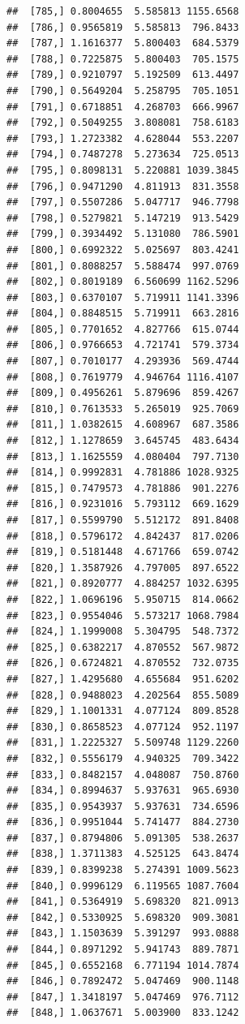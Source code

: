 \documentclass[article]{jss}\usepackage[]{graphicx}\usepackage[]{xcolor}
\makeatletter
\newenvironment{kframe}{%
 \def\at@end@of@kframe{}%
 \ifinner\ifhmode%
  \def\at@end@of@kframe{\end{minipage}}%
  \begin{minipage}{\columnwidth}%
 \fi\fi%
 \def\FrameCommand##1{\hskip\@totalleftmargin \hskip-\fboxsep
 \colorbox{shadecolor}{##1}\hskip-\fboxsep
     \hskip-\linewidth \hskip-\@totalleftmargin \hskip\columnwidth}%
 \MakeFramed {\advance\hsize-\width
   \@totalleftmargin\z@ \linewidth\hsize
   \@setminipage}}%
 {\par\unskip\endMakeFramed%
 \at@end@of@kframe}
\newenvironment{knitrout}{}{} %
\makeatother
\begin{document}
\begin{knitrout}
\begin{kframe}
\begin{verbatim}
##  [785,] 0.8004655  5.585813 1155.6568
##  [786,] 0.9565819  5.585813  796.8433
##  [787,] 1.1616377  5.800403  684.5379
##  [788,] 0.7225875  5.800403  705.1575
##  [789,] 0.9210797  5.192509  613.4497
##  [790,] 0.5649204  5.258795  705.1051
##  [791,] 0.6718851  4.268703  666.9967
##  [792,] 0.5049255  3.808081  758.6183
##  [793,] 1.2723382  4.628044  553.2207
##  [794,] 0.7487278  5.273634  725.0513
##  [795,] 0.8098131  5.220881 1039.3845
##  [796,] 0.9471290  4.811913  831.3558
##  [797,] 0.5507286  5.047717  946.7798
##  [798,] 0.5279821  5.147219  913.5429
##  [799,] 0.3934492  5.131080  786.5901
##  [800,] 0.6992322  5.025697  803.4241
##  [801,] 0.8088257  5.588474  997.0769
##  [802,] 0.8019189  6.560699 1162.5296
##  [803,] 0.6370107  5.719911 1141.3396
##  [804,] 0.8848515  5.719911  663.2816
##  [805,] 0.7701652  4.827766  615.0744
##  [806,] 0.9766653  4.721741  579.3734
##  [807,] 0.7010177  4.293936  569.4744
##  [808,] 0.7619779  4.946764 1116.4107
##  [809,] 0.4956261  5.879696  859.4267
##  [810,] 0.7613533  5.265019  925.7069
##  [811,] 1.0382615  4.608967  687.3586
##  [812,] 1.1278659  3.645745  483.6434
##  [813,] 1.1625559  4.080404  797.7130
##  [814,] 0.9992831  4.781886 1028.9325
##  [815,] 0.7479573  4.781886  901.2276
##  [816,] 0.9231016  5.793112  669.1629
##  [817,] 0.5599790  5.512172  891.8408
##  [818,] 0.5796172  4.842437  817.0206
##  [819,] 0.5181448  4.671766  659.0742
##  [820,] 1.3587926  4.797005  897.6522
##  [821,] 0.8920777  4.884257 1032.6395
##  [822,] 1.0696196  5.950715  814.0662
##  [823,] 0.9554046  5.573217 1068.7984
##  [824,] 1.1999008  5.304795  548.7372
##  [825,] 0.6382217  4.870552  567.9872
##  [826,] 0.6724821  4.870552  732.0735
##  [827,] 1.4295680  4.655684  951.6202
##  [828,] 0.9488023  4.202564  855.5089
##  [829,] 1.1001331  4.077124  809.8528
##  [830,] 0.8658523  4.077124  952.1197
##  [831,] 1.2225327  5.509748 1129.2260
##  [832,] 0.5556179  4.940325  709.3422
##  [833,] 0.8482157  4.048087  750.8760
##  [834,] 0.8994637  5.937631  965.6930
##  [835,] 0.9543937  5.937631  734.6596
##  [836,] 0.9951044  5.741477  884.2730
##  [837,] 0.8794806  5.091305  538.2637
##  [838,] 1.3711383  4.525125  643.8474
##  [839,] 0.8399238  5.274391 1009.5623
##  [840,] 0.9996129  6.119565 1087.7604
##  [841,] 0.5364919  5.698320  821.0913
##  [842,] 0.5330925  5.698320  909.3081
##  [843,] 1.1503639  5.391297  993.0888
##  [844,] 0.8971292  5.941743  889.7871
##  [845,] 0.6552168  6.771194 1014.7874
##  [846,] 0.7892472  5.047469  900.1148
##  [847,] 1.3418197  5.047469  976.7112
##  [848,] 1.0637671  5.003900  833.1242

\end{verbatim}
\end{kframe}
\end{knitrout}
\end{document}
